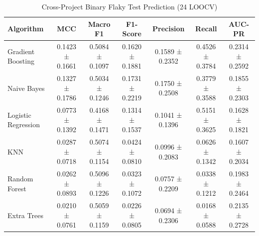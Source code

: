 \begin{table}
\caption{Cross-Project Binary Flaky Test Prediction (24 LOOCV)}
\label{tab:clf_summary}
\begin{tabular}{lcccccc}
\toprule
Algorithm & MCC & Macro F1 & F1-Score & Precision & Recall & AUC-PR \\
\midrule
Gradient Boosting & 0.1423 ± 0.1661 & 0.5084 ± 0.1097 & 0.1620 ± 0.1881 & 0.1589 ± 0.2352 & 0.4526 ± 0.3784 & 0.2314 ± 0.2592 \\
Naive Bayes & 0.1327 ± 0.1786 & 0.5034 ± 0.1246 & 0.1731 ± 0.2219 & 0.1750 ± 0.2508 & 0.3779 ± 0.3588 & 0.1855 ± 0.2303 \\
Logistic Regression & 0.0773 ± 0.1392 & 0.4168 ± 0.1471 & 0.1314 ± 0.1537 & 0.1041 ± 0.1396 & 0.5151 ± 0.3625 & 0.1628 ± 0.1821 \\
KNN & 0.0287 ± 0.0718 & 0.5074 ± 0.1154 & 0.0424 ± 0.0810 & 0.0996 ± 0.2083 & 0.0626 ± 0.1342 & 0.1607 ± 0.2034 \\
Random Forest & 0.0262 ± 0.0893 & 0.5096 ± 0.1226 & 0.0323 ± 0.1072 & 0.0757 ± 0.2209 & 0.0338 ± 0.1212 & 0.1983 ± 0.2464 \\
Extra Trees & 0.0210 ± 0.0761 & 0.5059 ± 0.1159 & 0.0226 ± 0.0805 & 0.0694 ± 0.2306 & 0.0168 ± 0.0588 & 0.2135 ± 0.2728 \\
\bottomrule
\end{tabular}
\end{table}
